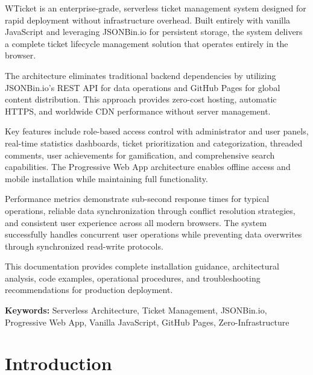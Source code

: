 \documentclass[12pt,a4paper]{report}
\begin{document}
WTicket is an enterprise-grade, serverless ticket management system designed for rapid deployment without infrastructure overhead. Built entirely with vanilla JavaScript and leveraging JSONBin.io for persistent storage, the system delivers a complete ticket lifecycle management solution that operates entirely in the browser.

The architecture eliminates traditional backend dependencies by utilizing JSONBin.io's REST API for data operations and GitHub Pages for global content distribution. This approach provides zero-cost hosting, automatic HTTPS, and worldwide CDN performance without server management.

Key features include role-based access control with administrator and user panels, real-time statistics dashboards, ticket prioritization and categorization, threaded comments, user achievements for gamification, and comprehensive search capabilities. The Progressive Web App architecture enables offline access and mobile installation while maintaining full functionality.

Performance metrics demonstrate sub-second response times for typical operations, reliable data synchronization through conflict resolution strategies, and consistent user experience across all modern browsers. The system successfully handles concurrent user operations while preventing data overwrites through synchronized read-write protocols.

This documentation provides complete installation guidance, architectural analysis, code examples, operational procedures, and troubleshooting recommendations for production deployment.

\textbf{Keywords:} Serverless Architecture, Ticket Management, JSONBin.io, Progressive Web App, Vanilla JavaScript, GitHub Pages, Zero-Infrastructure

\cleardoublepage

\tableofcontents
\cleardoublepage

\listoffigures
\cleardoublepage

\listoftables
\cleardoublepage

\lstlistoflistings
\cleardoublepage

\chapter{Introduction}
\thispagestyle{fancy}
\label{chap:introduction}
\end{document}

